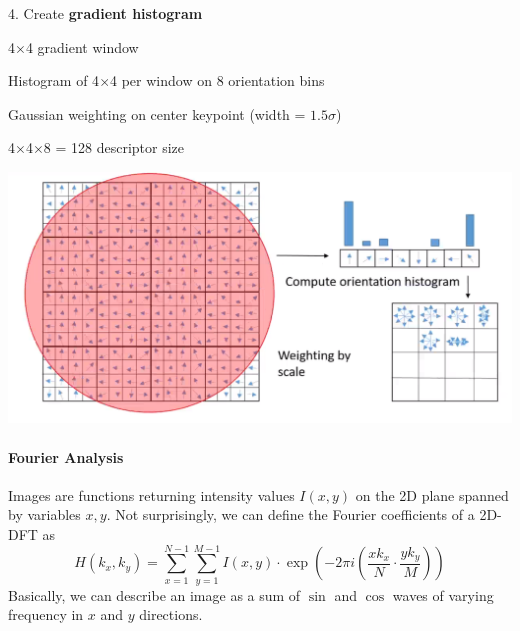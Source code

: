\documentclass[10pt]{report}
\begin{document}
\begin{list}{}{}
	\item[4.] Create \textbf{gradient histogram}\begin{list}{}{}
		\item 4$\times$4 gradient window
		\item Histogram of 4$\times$4 per window on 8 orientation bins
		\item Gaussian weighting on center keypoint (width = $1.5\sigma$)
		\item 4$\times$4$\times$8 = 128 descriptor size
	\end{list}
\end{list}
\begin{center}
	\includegraphics[scale=0.33]{3.png}
\end{center}
\paragraph{Fourier Analysis} Images are functions returning intensity values $I(x,y)$ on the 2D plane spanned by variables $x,y$. Not surprisingly, we can define the Fourier coefficients of a 2D-DFT as
$$H(k_x,k_y)=\sum_{x=1}^{N-1}\sum_{y=1}^{M-1}I(x,y)\cdot \exp\left(-2\pi i\left(\frac{xk_x}{N}\cdot\frac{yk_y}{M}\right)\right)$$
Basically, we can describe an image as a sum of $\sin$ and $\cos$ waves of varying frequency in $x$ and $y$ directions.
\end{document}

